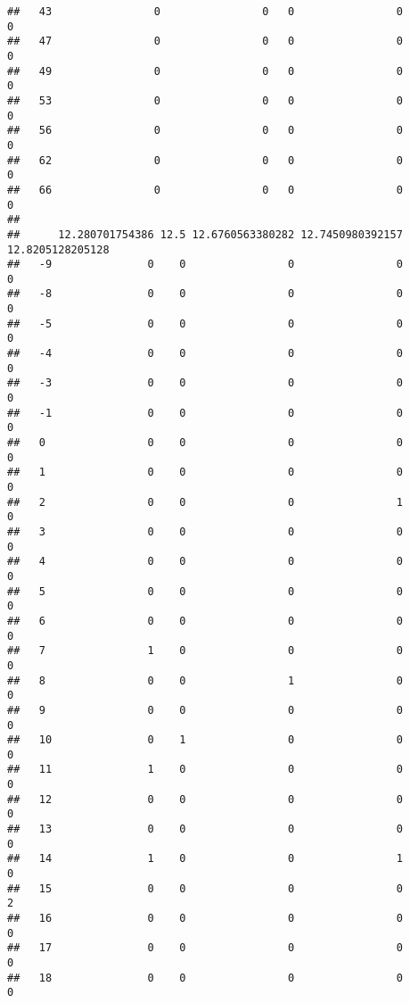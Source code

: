 \documentclass[]{article}
\begin{document}
\begin{verbatim}
##   43                0                0   0                0                0
##   47                0                0   0                0                0
##   49                0                0   0                0                0
##   53                0                0   0                0                0
##   56                0                0   0                0                0
##   62                0                0   0                0                0
##   66                0                0   0                0                0
##     
##      12.280701754386 12.5 12.6760563380282 12.7450980392157 12.8205128205128
##   -9               0    0                0                0                0
##   -8               0    0                0                0                0
##   -5               0    0                0                0                0
##   -4               0    0                0                0                0
##   -3               0    0                0                0                0
##   -1               0    0                0                0                0
##   0                0    0                0                0                0
##   1                0    0                0                0                0
##   2                0    0                0                1                0
##   3                0    0                0                0                0
##   4                0    0                0                0                0
##   5                0    0                0                0                0
##   6                0    0                0                0                0
##   7                1    0                0                0                0
##   8                0    0                1                0                0
##   9                0    0                0                0                0
##   10               0    1                0                0                0
##   11               1    0                0                0                0
##   12               0    0                0                0                0
##   13               0    0                0                0                0
##   14               1    0                0                1                0
##   15               0    0                0                0                2
##   16               0    0                0                0                0
##   17               0    0                0                0                0
##   18               0    0                0                0                0

\end{verbatim}
\end{document}

